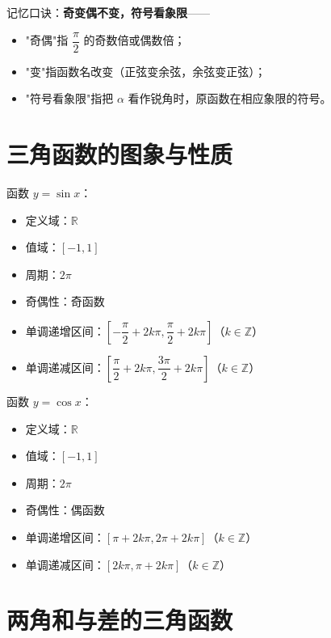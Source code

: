 \begin{note}
记忆口诀：\textbf{奇变偶不变，符号看象限}——
\begin{itemize}
    \item "奇偶"指 $\dfrac{\pi}{2}$ 的奇数倍或偶数倍；
    \item "变"指函数名改变（正弦变余弦，余弦变正弦）；
    \item "符号看象限"指把 $\alpha$ 看作锐角时，原函数在相应象限的符号。
\end{itemize}
\end{note}

\section{三角函数的图象与性质}

\begin{theorem}[正弦函数的图象与性质]
函数 $y = \sin x$：
\begin{itemize}
    \item 定义域：$\mathbb{R}$
    \item 值域：$[-1, 1]$
    \item 周期：$2\pi$
    \item 奇偶性：奇函数
    \item 单调递增区间：$\left[-\dfrac{\pi}{2} + 2k\pi, \dfrac{\pi}{2} + 2k\pi\right]$（$k \in \mathbb{Z}$）
    \item 单调递减区间：$\left[\dfrac{\pi}{2} + 2k\pi, \dfrac{3\pi}{2} + 2k\pi\right]$（$k \in \mathbb{Z}$）
\end{itemize}
\end{theorem}

\begin{theorem}[余弦函数的图象与性质]
函数 $y = \cos x$：
\begin{itemize}
    \item 定义域：$\mathbb{R}$
    \item 值域：$[-1, 1]$
    \item 周期：$2\pi$
    \item 奇偶性：偶函数
    \item 单调递增区间：$[\pi + 2k\pi, 2\pi + 2k\pi]$（$k \in \mathbb{Z}$）
    \item 单调递减区间：$[2k\pi, \pi + 2k\pi]$（$k \in \mathbb{Z}$）
\end{itemize}
\end{theorem}

\section{两角和与差的三角函数}

